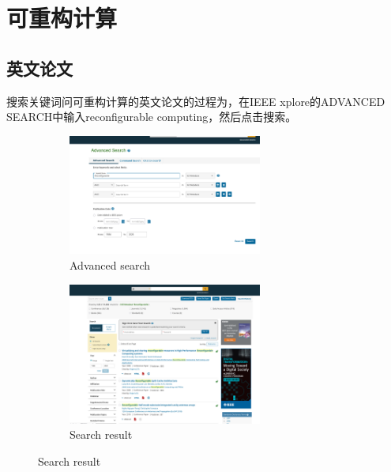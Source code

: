 \section{可重构计算}

\subsection{英文论文}

搜索关键词问可重构计算的英文论文的过程为，在IEEE xplore的ADVANCED SEARCH中输入reconfigurable computing，然后点击搜索。

\begin{figure}[H]
    \centering
    \begin{subfigure}{0.8\textwidth}
        \centering
        \includegraphics[width=0.7\textwidth]{./asserts/reconfigurable_computing_search.png}
        \caption{Advanced search}
    \end{subfigure}


    \begin{subfigure}{0.8\textwidth}
        \centering
        \includegraphics[width=0.7\textwidth]{./asserts/reconfg_res_en.png}
        \caption{Search result}
    \end{subfigure}
\end{figure}


